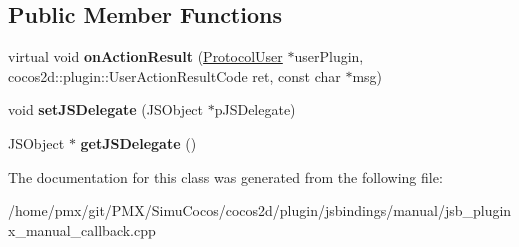 \subsection*{Public Member Functions}
\begin{DoxyCompactItemize}
\item 
\mbox{\label{classPluginx__UserActionListener_a8084121935a70441e96f3613f70f2411}} 
virtual void {\bfseries on\+Action\+Result} (\hyperlink{classcocos2d_1_1plugin_1_1ProtocolUser}{Protocol\+User} $\ast$user\+Plugin, cocos2d\+::plugin\+::\+User\+Action\+Result\+Code ret, const char $\ast$msg)
\item 
\mbox{\label{classPluginx__UserActionListener_a2c6fefdfcdc1eab3d89f82284b9ab2c0}} 
void {\bfseries set\+J\+S\+Delegate} (J\+S\+Object $\ast$p\+J\+S\+Delegate)
\item 
\mbox{\label{classPluginx__UserActionListener_a538203afa4707493dfc40b5631dc3249}} 
J\+S\+Object $\ast$ {\bfseries get\+J\+S\+Delegate} ()
\end{DoxyCompactItemize}


The documentation for this class was generated from the following file\+:\begin{DoxyCompactItemize}
\item 
/home/pmx/git/\+P\+M\+X/\+Simu\+Cocos/cocos2d/plugin/jsbindings/manual/jsb\+\_\+pluginx\+\_\+manual\+\_\+callback.\+cpp\end{DoxyCompactItemize}
